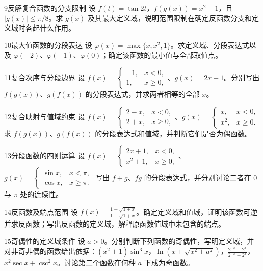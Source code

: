 \begin{exercise}{9}{反解复合函数的分支限制}
设 $f(t)=\tan2t$，$f(g(x))=x^2-1$，且 $|g(x)|\le\pi/8$。求 $g(x)$ 及其最大定义域，说明范围限制在确定反函数分支和定义域时各起什么作用。
\end{exercise}
\begin{exercise}{10}{最大值函数的分段表达}
设 $\varphi(x)=\max\{x,x^2,1\}$。求定义域、分段表达式以及 $\varphi(-2)$、$\varphi(-1)$、$\varphi(0)$；确定该函数的最小值与全部取值点。
\end{exercise}
\begin{exercise}{11}{复合次序与分段边界}
设 $f(x)=\begin{cases}-1,&x<0,\\1,&x\ge0,\end{cases}$、$g(x)=2x-1$。分别写出 $f(g(x))$、$g(f(x))$ 的分段表达式，并求两者相等的全部 $x$。
\end{exercise}
\begin{exercise}{12}{复合映射与值域约束}
设 $f(x)=\begin{cases}2-x,&x<0,\\2+x,&x\ge0,\end{cases}$、$g(x)=\begin{cases}x,&x<0,\\x^2,&x\ge0.\end{cases}$ 求 $f(g(x))$、$g(f(x))$ 的分段表达式和值域，并判断它们是否为偶函数。
\end{exercise}
\begin{exercise}{13}{分段函数的四则运算}
设 $f(x)=\begin{cases}2x+1,&x<0,\\x^2+1,&x\ge0,\end{cases}$、$g(x)=\begin{cases}\sin x,&x<\pi,\\\cos x,&x\ge\pi.\end{cases}$ 写出 $f+g$、$fg$ 的分段表达式，并分别讨论二者在 $0$ 与 $\pi$ 处的连续性。
\end{exercise}
\begin{exercise}{14}{反函数及端点范围}
设 $f(x)=\frac{1-\sqrt{1+x}}{1+\sqrt{1+x}}$。确定定义域和值域，证明该函数可逆并求反函数；写出反函数的定义域，解释原函数值域中未包含的端点。
\end{exercise}
\begin{exercise}{15}{奇偶性的定义域条件}
设 $a>0$。分别判断下列函数的奇偶性，写明定义域，并对非奇非偶的函数给出依据：$ (x^2+1)\sin^3x$，$\ln(x+\sqrt{x^2+a^2})$，$\frac{2^{-x}-2^x}{2^{-x}+2^x}$，$x^2\sec x+\csc^2x$。讨论第二个函数在何种 $a$ 下成为奇函数。
\end{exercise}
